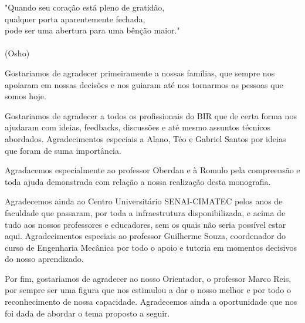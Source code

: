 \begin{agradecimentos}
\begin{flushright}
	"Quando seu coração está pleno de gratidão,\\ qualquer porta aparentemente fechada,\\ 
	pode ser uma abertura para uma bênção maior." \\
	\ \\
	(Osho)
\end{flushright}
Gostariamos de agradecer primeiramente a nossas famílias, que sempre nos apoiaram em nossas decisões e nos guiaram até nos tornarmos as pessoas que somos hoje.

Gostariamos de agradecer a todos os profissionais do BIR que de certa forma nos ajudaram com ideias, feedbacks, discussões e até mesmo assuntos técnicos abordados. Agradecimentos especiais a Alano, Téo e Gabriel Santos por ideias que foram de suma importância.

Agradacemos especialmente ao professor Oberdan e à Romulo pela compreensão e toda ajuda demonstrada com relação a nossa realização desta monografia. 

Agradecemos ainda ao Centro Universitário SENAI-CIMATEC pelos anos de faculdade que passaram, por toda a infraestrutura disponibilizada, e acima de tudo aos nossos professores e educadores, sem os quais não seria possível estar aqui. Agradecimentos especiais ao professor Guilherme Souza, coordenador do curso de Engenharia Mecânica por todo o apoio e tutoria em momentos decisivos do nosso aprendizado.

Por fim, gostariamos de agradecer ao nosso Orientador, o professor Marco Reis, por sempre ser uma figura que nos estimulou a dar o nosso melhor e por todo o reconhecimento de nossa capacidade. Agradecemos ainda a oportunidade que nos foi dada de abordar o tema proposto a seguir.
\end{agradecimentos}